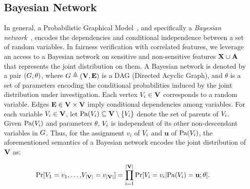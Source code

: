 \subsection{Bayesian Network}
In general, a Probabilistic Graphical Model~\cite{koller2009probabilistic}, and specifically a \textit{Bayesian network}~\cite{pearl1985bayesian,chavira2008probabilistic}, encodes the dependencies and conditional independence between a set of random variables. In fairness verification with correlated features, we leverage an access to a Bayesian network on sensitive and non-sensitive features $ \mathbf{X} \cup \mathbf{A} $ that represents the joint distribution on them. A Bayesian network is denoted by a pair $ (G, \theta)$, where $ G \triangleq (\mathbf{V}, \mathbf{E}) $ is a DAG (Directed Acyclic Graph), and $\theta$ is a set of parameters encoding the conditional probabilities induced by the joint distribution under investigation. Each vertex $V_i \in \mathbf{V}$ corresponds to a random variable. Edges $ \mathbf{E} \in \mathbf{V} \times \mathbf{V} $ imply conditional dependencies among variables. For each variable $ V_i \in \mathbf{V} $, let $ \mathrm{Pa}(V_i) \subseteq \mathbf{V} \setminus \{V_i\} $ denote the set of parents of $ V_i $. Given $\mathrm{Pa}(V_i)$ and parameters $\theta$, $ V_i $ is independent of its other non-descendant variables in $G$. Thus, for the assignment $ v_i $ of $ V_i $ and $ \mathbf{u} $ of $ \mathrm{Pa}(V_i) $, the aforementioned semantics of a Bayesian network encodes the joint distribution of $\mathbf{V}$ as:

\begin{equation}
	\begin{split}
		\Pr[V_1=v_1, \dots, &V_{|\mathbf{V}|}=v_{|\mathbf{V}|}] = \prod_{i=1}^{|\mathbf{V}|} \Pr[V_i = v_i | \mathrm{Pa}(V_i) = \mathbf{u}; \theta].
	\end{split}
	\label{fvgm_eq:BN}
\end{equation}



